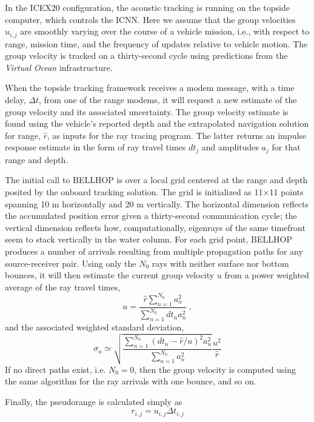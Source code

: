  In the ICEX20 configuration, the acoustic tracking is running on the topside computer, which controls the ICNN.
Here we assume that the group velocities $u_{i,j}$ are smoothly varying over the course of a vehicle mission, i.e., with respect to range, mission time, and the frequency of updates relative to vehicle motion. 
The group velocity is tracked on a thirty-second cycle using predictions from the \textit{Virtual Ocean} infrastructure.

 When the topside tracking framework receives a modem message, with a time delay, $\Delta t$, from one of the range modems, it will request a new estimate of the group velocity and its associated uncertainty.
The group velocity estimate is found using the vehicle's reported depth and the extrapolated navigation solution for range, $\hat{r}$, as inputs for the ray tracing program.
The latter returns an impulse response estimate in the form of ray travel times $dt_{j}$ and amplitudes $a_{j}$ for that range and depth.

 The initial call to BELLHOP is over a local grid centered at the range and depth posited by the onboard tracking solution.
The grid is initialized as 11$\times$11 points spanning 10 m horizontally and 20 m vertically.
The horizontal dimension reflects the accumulated position error given a thirty-second communication cycle; the vertical dimension reflects how, computationally, eigenrays of the same timefront seem to stack vertically in the water column. 
For each grid point, BELLHOP produces a number of arrivals resulting from multiple propagation paths for any source-receiver pair.
Using only the $N_0$ rays with neither surface nor bottom bounces, it will then estimate the current group velocity $u$ from a power weighted average of the ray travel times,
\begin{equation}
u = \frac{\hat{r} \sum_{n=1}^{N_{0}} a_{n}^{2}}{\sum_{n=1}^{N_{0}} dt_{n}a_{n}^{2}} ~, 
\end{equation}
and the associated weighted standard deviation,
\begin{equation}
\sigma_{u} \simeq \sqrt{\frac {\sum_{n=1}^{N_{0}} (dt_{n}-\hat{r}/u)^{2}a_{n}^{2}}{ \sum_{n=1}^{N_{0}} a_{n}^{2}} } \frac{u^{2}}{\hat{r}}
\end{equation}
If no direct paths exist, i.e. $N_{0}=0$, then the group velocity is computed using the same algorithm for the ray arrivals with one bounce, and so on.

Finally, the pseudorange is calculated simply as
\begin{equation}
r_{i,j} = u_{i,j} \Delta t_{i,j} 
\end{equation}

